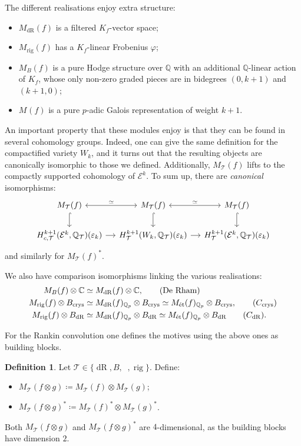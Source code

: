 \documentclass[11pt, a4paper, reqno]{amsart}
\theoremstyle{definition}
\newtheorem{definition}{Definition}[subsection]
\theoremstyle{plain}
\theoremstyle{remark}
\DeclareMathOperator{\et}{\acute{e}t}
\DeclareMathOperator{\rig}{rig}
\DeclareMathOperator{\dR}{dR}
\newcommand{\numberset}{\mathbb}
\newcommand{\C}{\numberset{C}}
\newcommand{\Q}{\numberset{Q}}
\newcommand{\BdR}{B_{\dR}}
\newcommand{\Bcrys}{B_{\mathrm{crys}}}
\renewcommand{\epsilon}{\varepsilon}
\newcommand{\Ell}{\mathcal{E}}
\newcommand{\theory}{\mathcal{T}}
\begin{document}
  The different realisations enjoy extra structure:
  \begin{itemize}
   \item $M_{\dR}(f)$ is a filtered $K_f$-vector space;
   \item $M_{\rig}(f)$ has a $K_f$-linear Frobenius $\varphi$;
   \item $M_B(f)$ is a pure Hodge structure over $\Q$ with an additional $\Q$-linear action of $K_f$, whose only non-zero graded pieces are in bidegrees $(0, k+1)$ and $(k+1, 0)$;
   \item $M_{\et}(f)$ is a pure $p$-adic Galois representation of weight $k+1$.
  \end{itemize}

  An important property that these modules enjoy is that they can be found in several cohomology groups. Indeed, one can give the same definition for the compactified variety $W_k$, and it turns out that the resulting objects are canonically isomorphic to those we defined. Additionally, $M_{\theory}(f)$ lifts to the compactly supported cohomology of $\Ell^k$. To sum up, there are \emph{canonical} isomorphisms:
  \[
   \begin{tikzcd}[column sep=small]
    M_{\theory}(f) \arrow[<->,"\simeq"]{r} \arrow[hook]{d} &
    M_{\theory}(f) \arrow[<->,"\simeq"]{r} \arrow[hook]{d} &
    M_{\theory}(f) \arrow[hook]{d} \\
    H_{c,\theory}^{k+1}(\Ell^k, \Q_{\theory})(\epsilon_k) \ar[r] &
    H_{\theory}^{k+1}(W_k, \Q_{\theory})(\epsilon_k) \ar[r] &
    H_{\theory}^{k+1}(\Ell^k, \Q_{\theory})(\epsilon_k)
   \end{tikzcd}
  \]
  and similarly for $M_\theory(f)^*$.

  We also have comparison isomorphisms linking the various realisations:
  \begin{align}
   M_B(f) \otimes \C &\simeq M_{\dR}(f) \otimes \C, \tag{De Rham}\\
   M_{\rig}(f) \otimes \Bcrys &\simeq M_{\dR}(f)_{\Q_p} \otimes \Bcrys \simeq M_{\et}(f)_{\Q_p} \otimes \Bcrys, \tag{$C_{\mathrm{crys}}$} \\
   M_{\rig}(f) \otimes \BdR &\simeq M_{\dR}(f)_{\Q_p} \otimes \BdR \simeq M_{\et}(f)_{\Q_p} \otimes \BdR \tag{$C_{\dR}$}.
  \end{align}

  For the Rankin convolution one defines the motives using the above ones as building blocks.
  \begin{definition}
   Let $\theory\in\{\dR,B,\et,\rig\}$. Define:
   \begin{itemize}
    \item $M_{\theory}(f\otimes g) \coloneqq M_{\theory}(f) \otimes M_{\theory}(g)$;
    \item $M_{\theory}(f\otimes g)^* \coloneqq M_{\theory}(f)^* \otimes M_{\theory}(g)^*$.
   \end{itemize}
   Both $M_{\theory}(f\otimes g)$ and $M_{\theory}(f\otimes g)^*$ are $4$-dimensional, as the building blocks have dimension $2$.
  \end{definition}
\end{document}
